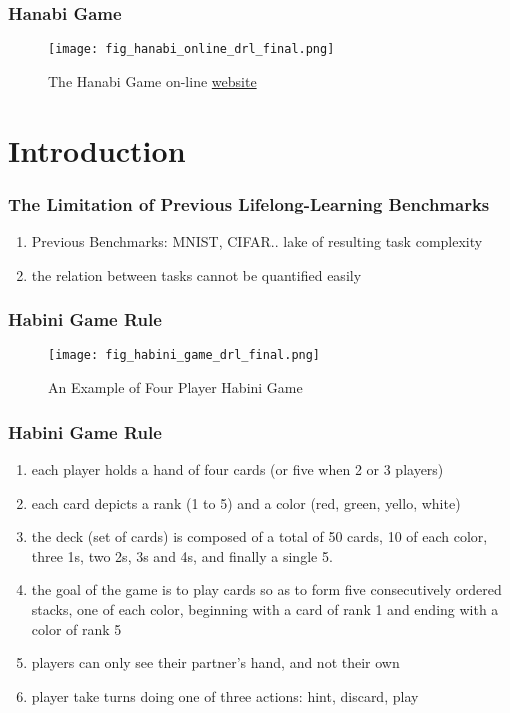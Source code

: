 \documentclass{njupre/njupre}
\begin{document}
\begin{frame}
    \frametitle{Hanabi Game}
    \begin{figure}
        \texttt{[image: fig\_hanabi\_online\_drl\_final.png]}
        \caption[short]{The Hanabi Game on-line \href{https://en.boardgamearena.com/gamepanel?game=hanabi}{website}}
    \end{figure}

\end{frame}

\section{Introduction}
\begin{frame}
    \frametitle{The Limitation of Previous Lifelong-Learning Benchmarks}
    \begin{enumerate}
        \item Previous Benchmarks: MNIST, CIFAR.. lake of resulting task complexity
        \item the relation between tasks cannot be quantified easily
    \end{enumerate}
\end{frame}


\begin{frame}
    \frametitle{Habini Game Rule}

    \begin{figure}
        \texttt{[image: fig\_habini\_game\_drl\_final.png]}
        \caption[short]{An Example of Four Player Habini Game \cite{bardHanabiChallengeNew2020}}
    \end{figure}
\end{frame}


\begin{frame}
    \frametitle{Habini Game Rule}

    \begin{enumerate}
        \item each player holds a hand  of four cards (or five when 2 or 3 players)
        \item each card depicts a rank (1 to 5) and a color (red, green, yello, white)
        \item the deck (set of cards) is composed of a total of 50 cards, 10 of each color, three 1s, two 2s, 3s and 4s, and finally a single 5.
        \item the goal of the game is to play cards so as to form five consecutively ordered stacks, one of each color, beginning with a card of rank 1 and ending with a color of rank 5
        \item players can only see their partner's hand, and not their own
        \item player take turns doing one of three actions: hint, discard, play
    \end{enumerate}
\end{frame}
\end{document}
